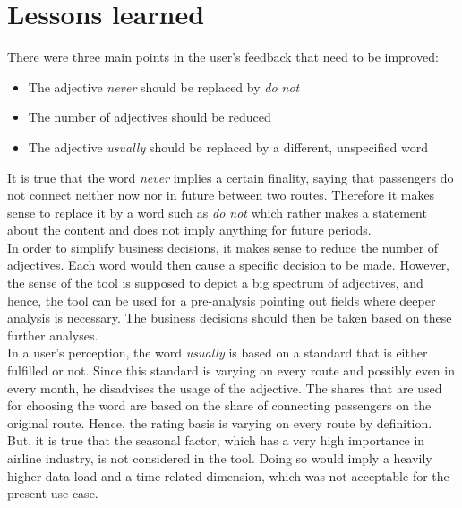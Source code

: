 \documentclass[conference]{IEEEtran}
\begin{document}
\section{Lessons learned}
There were three main points in the user's feedback that need to be improved:
\begin{itemize}
\item The adjective \emph{never} should be replaced by \emph{do not}
\item The number of adjectives should be reduced
\item The adjective \emph{usually} should be replaced by a different, unspecified word
\end{itemize}
It is true that the word \emph{never} implies a certain finality, saying that passengers do not connect neither now nor in future between two routes. Therefore it makes sense to replace it by a word such as \emph{do not} which rather makes a statement about the content and does not imply anything for future periods.\\
In order to simplify business decisions, it makes sense to reduce the number of adjectives. Each word would then cause a specific decision to be made. However, the sense of the tool is supposed to depict a big spectrum of adjectives, and hence, the tool can be used for a pre-analysis pointing out fields where deeper analysis is necessary. The business decisions should then be taken based on these further analyses.\\
In a user's perception, the word \emph{usually} is based on a standard that is either fulfilled or not. Since this standard is varying on every route and possibly even in every month, he disadvises the usage of the adjective. The shares that are used for choosing the word are based on the share of connecting passengers on the original route. Hence, the rating basis is varying on every route by definition. But, it is true that the seasonal factor, which has a very high importance in airline industry, is not considered in the tool. Doing so would imply a heavily higher data load and a time related dimension, which was not acceptable for the present use case.
\end{document}
